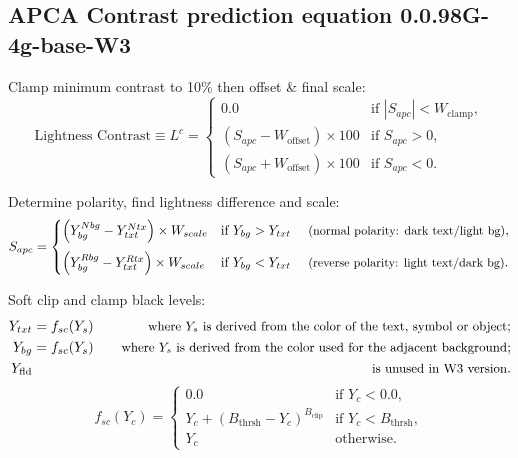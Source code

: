 \documentclass[a4paper,12pt]{article}
\begin{document}

\subsection*{APCA Contrast prediction equation 0.0.98G-4g-base-W3}

\vspace*{2ex} \noindent
Clamp minimum contrast to 10\% then offset \& final scale:
\begin{equation*}
  \text{Lightness Contrast} \equiv L^c =
  \begin{cases}
    0.0 &
    \text{if $\left|S_{apc}\right| < W_\text{clamp}$},\\
    \left(S_{apc} - W_\text{offset}\right) \times 100 &
    \text{if $S_{apc} > 0$},\\
    \left(S_{apc} + W_\text{offset}\right) \times 100 &
    \text{if $S_{apc} < 0$}.
  \end{cases}
\end{equation*}

\vspace*{2ex} \noindent
Determine polarity, find lightness difference and scale:
\begin{equation*}
  S_{apc} =
  \begin{cases}
    \left(Y_{bg}^{Nbg} - Y_{txt}^{Ntx}\right) \times W_{scale} &
    \text{if $Y_{bg} > Y_{txt}$ \quad
    \small (normal polarity: dark text/light bg)},\\[2ex]
    \left(Y_{bg}^{Rbg} - Y_{txt}^{Rtx}\right) \times W_{scale} &
    \text{if $Y_{bg} < Y_{txt}$ \quad
    \small (reverse polarity: light text/dark bg)}.
  \end{cases}
\end{equation*}

\vspace*{2ex} \noindent
Soft clip and clamp black levels:
\begin{equation*}
  \begin{aligned}
    Y_{txt} & = f_{sc}(Y_s) \quad & \text{\small where $Y_s$
    is derived from the color of the text, symbol or object};\\
    Y_{bg} & = f_{sc}(Y_s) \quad & \text{\small where $Y_s$
    is derived from the color used for the adjacent background};\\
    Y_\text{fld} &\ & \text{\small is unused in W3 version}.
  \end{aligned}
\end{equation*}
%
\begin{equation*}
  f_{sc}(Y_c) =
  \begin{cases}
    0.0 & \text{if $Y_c < 0.0$},\\
    Y_c + \left(B_\text{thrsh} - Y_c\right)^{B_\text{clip}} &
    \text{if $Y_c < B_\text{thrsh}$}, \\
    Y_c & \text{otherwise}.
  \end{cases}
\end{equation*}
\end{document}
